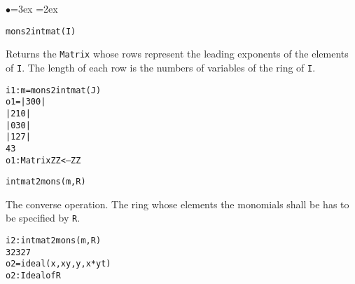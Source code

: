 \documentclass[11pt]{amsart}
\newenvironment{example}
  {\begin{alltt}\small}
  {\end{alltt}}
\newenvironment{functions}
  {\begin{list}{$\bullet$}{\leftmargin=3ex \labelwidth=2ex
  \listparindent=0pt \itemsep=6pt \parsep=3pt}}
  {\end{list}}
\begin{document}
\begin{functions}
\item\verb+mons2intmat(I)+

Returns the {\tt Matrix} whose rows represent the leading exponents
of the elements of {\tt I}. The length of each row is the numbers of
variables of the ring of {\tt I}.

\begin{example}
i1 : m=mons2intmat(J)
o1 = | 3 0 0 |
     | 2 1 0 |
     | 0 3 0 |
     | 1 2 7 |
              4        3
o1 : Matrix ZZ  <--- ZZ
\end{example}

\item\verb+intmat2mons(m,R)+

The converse operation. The ring whose elements the monomials shall be has to be specified by {\tt R}.

\begin{example}
i2 : intmat2mons(m,R)
               3   2    3     2 7
o2 = ideal (x , x y, y , x*y t )
o2 : Ideal of R
\end{example}

\end{functions}
\end{document}
